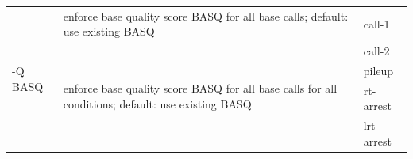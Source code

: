 {\small
\begin{tabular}{@{}p{}p{}l@{}}
\multirow{5}{=}{-Q BASQ} & enforce base quality score BASQ for all base calls;
 default: use existing BASQ & call-1 \\
 & \multirow{4}{=}{enforce base quality score BASQ for all base calls for all conditions;
 default: use existing BASQ} & call-2 \\
 & & pileup \\
 & & rt-arrest \\
 & & lrt-arrest \\
\end{tabular}\\
}